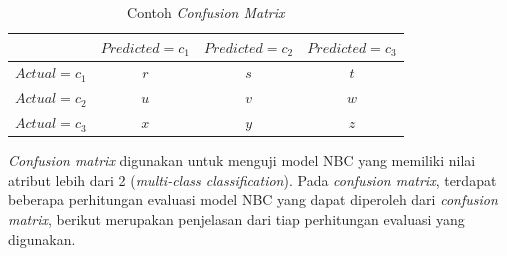 \begin{table}[h]
\label{tab:conf_matrix}
\centering
\caption{Contoh \textit{Confusion Matrix}}
\begin{tabular}{ | c | c | c | c | }
\hline
 & $Predicted=c_1$ & $Predicted=c_2$ & $Predicted=c_3$ \\ \hline \hline
$Actual=c_1$ & $r$ & $s$ & $t$ \\ \hline
$Actual=c_2$ & $u$ & $v$ & $w$ \\ \hline
$Actual=c_3$ & $x$ & $y$ & $z$ \\ \hline
\end{tabular}
\end{table}


\textit{Confusion matrix} digunakan untuk menguji model NBC yang memiliki nilai atribut lebih dari 2 (\textit{multi-class classification}). Pada \textit{confusion matrix}, terdapat beberapa perhitungan evaluasi model NBC yang dapat diperoleh dari \textit{confusion matrix}, berikut merupakan penjelasan dari tiap perhitungan evaluasi yang digunakan.
